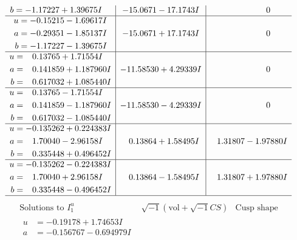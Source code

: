 \documentclass[1p]{elsarticle_modified}
\theoremstyle{definition}
\newcommand{\I}{\sqrt{-1}}
\begin{document}
$$\begin{array}{c|c|c}
\begin{aligned}
b &= -1.17227 + 1.39675 I\end{aligned}
 & -15.0671 - 17.1743 I & \phantom{-0.000000 } 0 \\ \hline\begin{aligned}
u &= -0.15215 - 1.69617 I \\
a &= -0.29351 - 1.85137 I \\
b &= -1.17227 - 1.39675 I\end{aligned}
 & -15.0671 + 17.1743 I & \phantom{-0.000000 } 0 \\ \hline\begin{aligned}
u &= \phantom{-}0.13765 + 1.71554 I \\
a &= \phantom{-}0.141859 + 1.187960 I \\
b &= \phantom{-}0.617032 + 1.085440 I\end{aligned}
 & -11.58530 + 4.29339 I & \phantom{-0.000000 } 0 \\ \hline\begin{aligned}
u &= \phantom{-}0.13765 - 1.71554 I \\
a &= \phantom{-}0.141859 - 1.187960 I \\
b &= \phantom{-}0.617032 - 1.085440 I\end{aligned}
 & -11.58530 - 4.29339 I & \phantom{-0.000000 } 0 \\ \hline\begin{aligned}
u &= -0.135262 + 0.224383 I \\
a &= \phantom{-}1.70040 - 2.96158 I \\
b &= \phantom{-}0.335448 + 0.496452 I\end{aligned}
 & \phantom{-}0.13864 + 1.58495 I & \phantom{-}1.31807 - 1.97880 I \\ \hline\begin{aligned}
u &= -0.135262 - 0.224383 I \\
a &= \phantom{-}1.70040 + 2.96158 I \\
b &= \phantom{-}0.335448 - 0.496452 I\end{aligned}
 & \phantom{-}0.13864 - 1.58495 I & \phantom{-}1.31807 + 1.97880 I\\
 \hline 
 \end{array}$$\newpage$$\begin{array}{c|c|c}  
\text{Solutions to }I^u_{1}& \I (\text{vol} + \sqrt{-1}CS) & \text{Cusp shape}\\
 \hline 
\begin{aligned}
u &= -0.19178 + 1.74653 I \\
a &= -0.156767 - 0.694979 I \\

\end{aligned}
\end{array}$$
\end{document}
